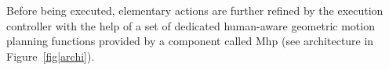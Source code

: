 \documentclass[preprint,3p,times]{elsarticle}
\begin{document}
%
%
%


Before being executed, elementary actions are further refined by the execution
controller with the help of a set of dedicated human-aware geometric motion
planning functions provided by a component called {\sc Mhp} (see architecture in Figure~\ref{fig|archi}).
\end{document}
